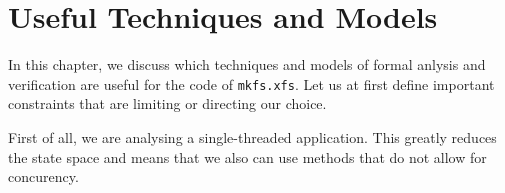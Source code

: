 
\chapter{Useful Techniques and Models}\label{chap:techniques}
In this chapter, we discuss which techniques and models of formal anlysis and verification are useful for the code of {\tt mkfs.xfs}. Let us at first define important constraints that are limiting or directing our choice.

First of all, we are analysing a single-threaded application. This greatly reduces the state space and means that we also can use methods that do not allow for concurency.
